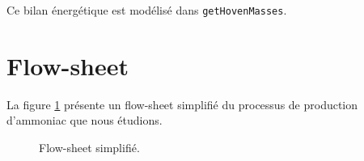 \documentclass[a4paper, oneside, 12pt]{article}
\begin{document}
Ce bilan énergétique est modélisé dans \texttt{getHovenMasses}.

\section{Flow-sheet}
\label{sec:flowsheet}

La figure \ref{fig:flowsheet} présente un flow-sheet simplifié du processus 
de production d'ammoniac que nous étudions.

\begin{figure}[h!]
	\begin{center}
		
	\end{center}
	\caption{Flow-sheet simplifié.}
	\label{fig:flowsheet}
\end{figure}

\printbibliography
\end{document}
